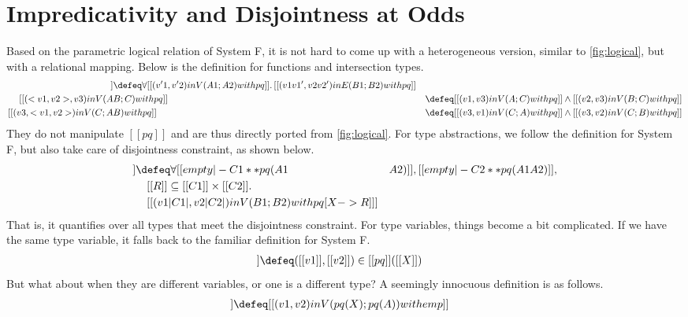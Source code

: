 \section{Impredicativity and Disjointness at Odds}
\label{sec:failed:lr}

Based on the parametric logical relation of System F, it is not hard to come up
with a heterogeneous version, similar to \cref{fig:logical}, but with a
relational mapping. Below is the definition for functions and intersection types.
\begin{align*}
 [[(v1, v2)  in V(A1 -> B1; A2 -> B2) with pq ]] &\defeq \forall [[(v'1, v'2) in V (A1; A2) with pq  ]].\, [[  (v1 v1' , v2 v2') in E (B1 ; B2) with pq   ]] \\
  [[( < v1 , v2 > , v3  )  in V ( A & B ;  C  ) with pq ]]  &\defeq [[ (v1, v3)  in V (A ; C) with pq ]] \land [[ (v2, v3)  in V (B ; C) with pq ]] \\
  [[( v3 , < v1 , v2 >  )  in V ( C ; A & B  ) with pq ]]  &\defeq [[ (v3, v1)  in V (C ; A) with pq ]] \land [[ (v3, v2)  in V (C ; B) with pq ]]
\end{align*}
They do not manipulate $[[pq]]$ and are thus directly ported from
\cref{fig:logical}. For type abstractions, we follow the definition for System
F, but also take care of disjointness constraint, as shown below.
\begin{align*}
  [[(v1, v2)  in V(\X ** A1 . B1; \X ** A2 . B2) with pq ]] &\defeq \forall [[empty |- C1 ** pq(A1 & A2) ]], [[empty |- C2 ** pq(A1 & A2)]], \\
                                                            & \quad [[R]] \subseteq [[C1]] \times [[C2]]. \\
                                                            & \quad [[ ( v1 |C1|, v2 |C2|) in V (B1 ; B2) with pq[X -> R]    ]]
\end{align*}
That is, it quantifies over all types that meet the disjointness constraint. For
type variables, things become a bit complicated. If we have the same type
variable, it falls back to the familiar definition for System F.
\begin{align*}
  [[(v1, v2)  in V(X; X) with pq ]] &\defeq ([[v1]], [[v2]]) \in [[pq]]([[X]])
\end{align*}
But what about when they are different variables, or one is a different type? A
seemingly innocuous definition is as follows.
\begin{align*}
  [[(v1, v2)  in V(X; A) with pq ]] &\defeq [[ (v1, v2) in V(pq(X); pq(A)) with emp  ]]
\end{align*}
